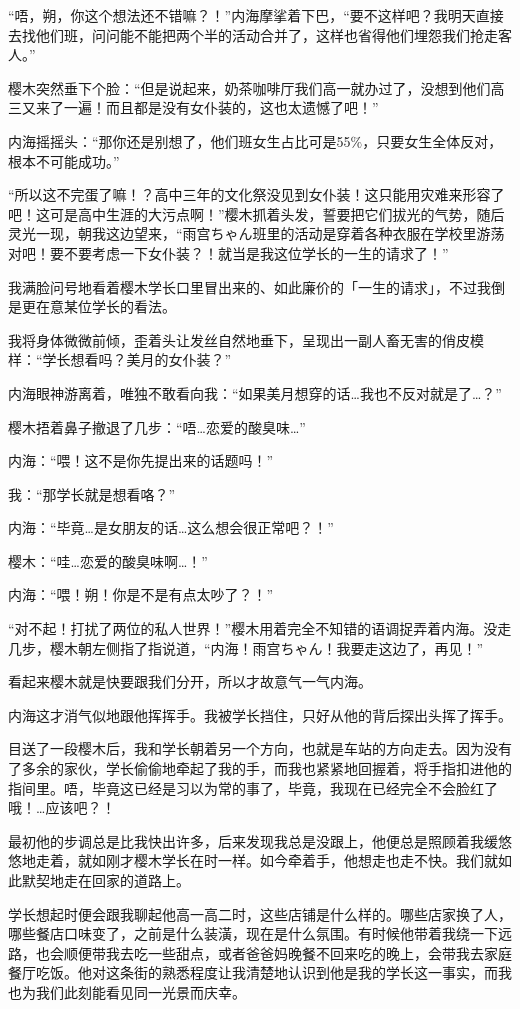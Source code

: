“唔，朔，你这个想法还不错嘛？！”内海摩挲着下巴，“要不这样吧？我明天直接去找他们班，问问能不能把两个半的活动合并了，这样也省得他们埋怨我们抢走客人。”

樱木突然垂下个脸：“但是说起来，奶茶咖啡厅我们高一就办过了，没想到他们高三又来了一遍！而且都是没有女仆装的，这也太遗憾了吧！”

内海摇摇头：“那你还是别想了，他们班女生占比可是55$\%$，只要女生全体反对，根本不可能成功。”

“所以这不完蛋了嘛！？高中三年的文化祭没见到女仆装！这只能用灾难来形容了吧！这可是高中生涯的大污点啊！”樱木抓着头发，誓要把它们拔光的气势，随后灵光一现，朝我这边望来，“雨宫ちゃん班里的活动是穿着各种衣服在学校里游荡对吧！要不要考虑一下女仆装？！就当是我这位学长的一生的请求了！”

我满脸问号地看着樱木学长口里冒出来的、如此廉价的「一生的请求」，不过我倒是更在意某位学长的看法。

我将身体微微前倾，歪着头让发丝自然地垂下，呈现出一副人畜无害的俏皮模样：“学长想看吗？美月的女仆装？”

内海眼神游离着，唯独不敢看向我：“如果美月想穿的话…我也不反对就是了…？”

樱木捂着鼻子撤退了几步：“唔…恋爱的酸臭味…”

内海：“喂！这不是你先提出来的话题吗！”

我：“那学长就是想看咯？”

内海：“毕竟…是女朋友的话…这么想会很正常吧？！”

樱木：“哇…恋爱的酸臭味啊…！”

内海：“喂！朔！你是不是有点太吵了？！”

“对不起！打扰了两位的私人世界！”樱木用着完全不知错的语调捉弄着内海。没走几步，樱木朝左侧指了指说道，“内海！雨宫ちゃん！我要走这边了，再见！”

看起来樱木就是快要跟我们分开，所以才故意气一气内海。

内海这才消气似地跟他挥挥手。我被学长挡住，只好从他的背后探出头挥了挥手。

目送了一段樱木后，我和学长朝着另一个方向，也就是车站的方向走去。因为没有了多余的家伙，学长偷偷地牵起了我的手，而我也紧紧地回握着，将手指扣进他的指间里。唔，毕竟这已经是习以为常的事了，毕竟，我现在已经完全不会脸红了哦！…应该吧？！

最初他的步调总是比我快出许多，后来发现我总是没跟上，他便总是照顾着我缓悠悠地走着，就如刚才樱木学长在时一样。如今牵着手，他想走也走不快。我们就如此默契地走在回家的道路上。

学长想起时便会跟我聊起他高一高二时，这些店铺是什么样的。哪些店家换了人，哪些餐店口味变了，之前是什么装潢，现在是什么氛围。有时候他带着我绕一下远路，也会顺便带我去吃一些甜点，或者爸爸妈晚餐不回来吃的晚上，会带我去家庭餐厅吃饭。他对这条街的熟悉程度让我清楚地认识到他是我的学长这一事实，而我也为我们此刻能看见同一光景而庆幸。

